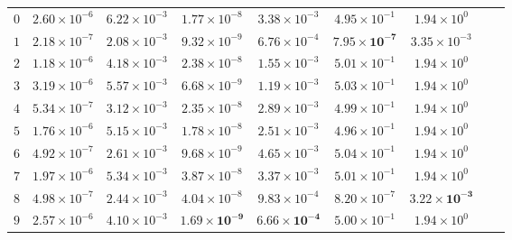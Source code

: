 \documentclass[review,hidelinks,onefignum,onetabnum]{siamart250211}
\begin{document}
\begin{table}[h]
{\begin{tabular}{ccccccccc}
$0$   &  $ 2.60 \times 10^{-6} $  &  $ 6.22 \times 10^{-3} $  &  $ 1.77 \times 10^{-8} $  &  $ 3.38 \times 10^{-3} $  &  $ 4.95 \times 10^{-1} $  &  $ 1.94 \times 10^{0} $ 
 \\ 

\rowcolor{mygray}$1$   &  $ 2.18 \times 10^{-7} $  &  $ 2.08 \times 10^{-3} $  &  $ 9.32 \times 10^{-9} $  &  $ 6.76 \times 10^{-4} $  &  $ \bm{7.95 \times 10^{-7}} $  &  $ 3.35 \times 10^{-3} $ 
 \\ 

 $2$   &  $ 1.18 \times 10^{-6} $  &  $ 4.18 \times 10^{-3} $  &  $ 2.38 \times 10^{-8} $  &  $ 1.55 \times 10^{-3} $  &  $ 5.01 \times 10^{-1} $  &  $ 1.94 \times 10^{0} $ 
 \\ 

\rowcolor{mygray}$3$   &  $ 3.19 \times 10^{-6} $  &  $ 5.57 \times 10^{-3} $  &  $ 6.68 \times 10^{-9} $  &  $ 1.19 \times 10^{-3} $  &  $ 5.03 \times 10^{-1} $  &  $ 1.94 \times 10^{0} $ 
 \\ 

 $4$   &  $ 5.34 \times 10^{-7} $  &  $ 3.12 \times 10^{-3} $  &  $ 2.35 \times 10^{-8} $  &  $ 2.89 \times 10^{-3} $  &  $ 4.99 \times 10^{-1} $  &  $ 1.94 \times 10^{0} $ 
 \\ 

\rowcolor{mygray}$5$   &  $ 1.76 \times 10^{-6} $  &  $ 5.15 \times 10^{-3} $  &  $ 1.78 \times 10^{-8} $  &  $ 2.51 \times 10^{-3} $  &  $ 4.96 \times 10^{-1} $  &  $ 1.94 \times 10^{0} $ 
 \\ 

 $6$   &  $ 4.92 \times 10^{-7} $  &  $ 2.61 \times 10^{-3} $  &  $ 9.68 \times 10^{-9} $  &  $ 4.65 \times 10^{-3} $  &  $ 5.04 \times 10^{-1} $  &  $ 1.94 \times 10^{0} $ 
 \\ 

\rowcolor{mygray}$7$   &  $ 1.97 \times 10^{-6} $  &  $ 5.34 \times 10^{-3} $  &  $ 3.87 \times 10^{-8} $  &  $ 3.37 \times 10^{-3} $  &  $ 5.01 \times 10^{-1} $  &  $ 1.94 \times 10^{0} $ 
 \\ 

 $8$   &  $ 4.98 \times 10^{-7} $  &  $ 2.44 \times 10^{-3} $  &  $ 4.04 \times 10^{-8} $  &  $ 9.83 \times 10^{-4} $  &  $ 8.20 \times 10^{-7} $  &  $ \bm{3.22 \times 10^{-3}} $ 
 \\ 

\rowcolor{mygray}$9$   &  $ 2.57 \times 10^{-6} $  &  $ 4.10 \times 10^{-3} $  &  $ \bm{1.69 \times 10^{-9}} $  &  $ \bm{6.66 \times 10^{-4}} $  &  $ 5.00 \times 10^{-1} $  &  $ 1.94 \times 10^{0} $ 
 \\ 


\end{tabular}}
\end{table}
\end{document}
